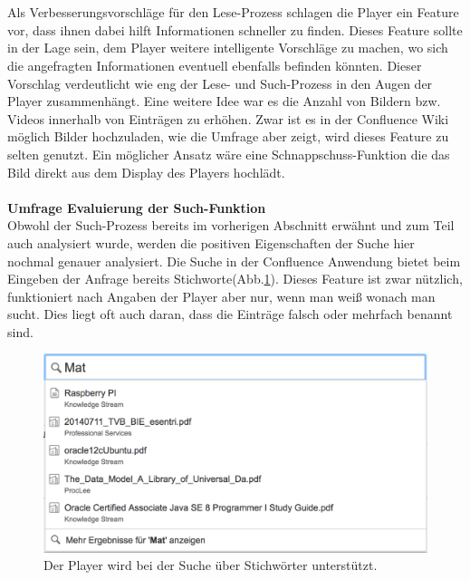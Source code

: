\documentclass[a4paper,12pt]{scrartcl}
\begin{document}
\\\\
Als Verbesserungsvorschläge für den Lese-Prozess schlagen die Player ein Feature vor, dass ihnen dabei hilft Informationen schneller zu finden. Dieses Feature sollte in der Lage sein, dem Player weitere intelligente Vorschläge zu machen, wo sich die angefragten Informationen eventuell ebenfalls befinden könnten. Dieser Vorschlag verdeutlicht wie eng der Lese- und Such-Prozess in den Augen der Player zusammenhängt. Eine weitere Idee war es die Anzahl von Bildern bzw. Videos innerhalb von Einträgen zu erhöhen. Zwar ist es in der Confluence Wiki möglich Bilder hochzuladen, wie die Umfrage aber zeigt, wird dieses Feature zu selten genutzt. Ein möglicher Ansatz wäre eine Schnappschuss-Funktion die das Bild direkt aus dem Display des Players hochlädt.
\\\\
\textbf{Umfrage Evaluierung der Such-Funktion}\\
Obwohl der Such-Prozess bereits im vorherigen Abschnitt erwähnt und zum Teil auch analysiert wurde, werden die positiven Eigenschaften der Suche hier nochmal genauer analysiert. Die Suche in der Confluence Anwendung bietet beim Eingeben der Anfrage bereits Stichworte(Abb.\ref{Sucheingabe}). Dieses Feature ist zwar nützlich, funktioniert nach Angaben der Player aber nur, wenn man weiß wonach man sucht. Dies liegt oft auch daran, dass die Einträge falsch oder mehrfach benannt sind. 
\\
\begin{figure}[h!]
\begin{center}
\includegraphics[scale = 0.4]{Bilder/Sucheingabe.eps}
\caption{Der Player wird bei der Suche über Stichwörter unterstützt.}
\label{Sucheingabe}
\end{center}
\end{figure}
\\
\end{document}

